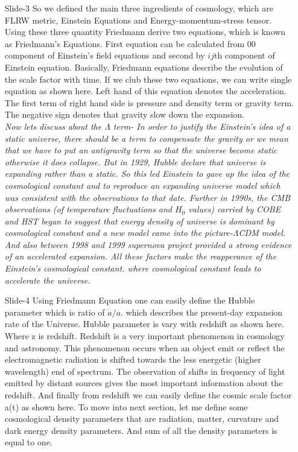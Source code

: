 \documentclass[12pt]{report}
\begin{document}
\begin{itemize}
\item[\ding{74} Slide-3]
So we defined the main three ingredients of cosmology, which are FLRW metric, Einstein Equations and Energy-momentum-stress tensor. Using these three quantity Friedmann derive two equations, which is known as Friedmann's Equations. First equation can be calculated from 00 component of Einstein’s field equations and second by  $ij$th component of Einstein equation. Basically, Friedmann equations describe the evolution of the scale factor with time.  If we club these two equations, we can write single equation as shown here. Left hand of this equation denotes the acceleration. The first term of right hand side is pressure and density term or gravity term. The negative sign denotes that gravity slow down the expansion.\\
\textit{Now lets discuss about the $\Lambda$ term- In order to justify the Einstein's idea of a static universe, there should be a term to compensate the gravity or we mean that we have to put an antigravity term so that the universe become static otherwise it does collapse. But in 1929, Hubble declare that universe is expanding rather than a static. So this led Einstein to gave up the idea of the cosmological constant and to reproduce an expanding universe model which was consistent with the observations to that date. Further in 1990s, the CMB observations (of temperature fluctuations and $H_0$ values) carried by COBE and HST began to suggest that energy density of universe is dominant by cosmological constant and a new model came into the picture-$\Lambda$CDM model. And also between 1998 and 1999 supernova project provided a strong evidence of an accelerated expansion. All these factors make the reapperance of the Einstein's cosmological constant.
where cosmological constant leads to accelerate the universe.} 

\item[\ding{74} Slide-4]
Using Friedmann Equation one can easily define the Hubble parameter which is ratio of $\dot{a}/a$. which describes the present-day expansion rate of the Universe. Hubble parameter is vary with redshift as shown here. Where z is redshift. Redshift is a very important phenomenon in cosmology and astronomy. This phenomenon occurs when an object emit or reflect the electromagnetic radiation is shifted towards the less energetic (higher wavelength) end of spectrum. 
The observation of shifts in frequency of light emitted by distant sources gives the most important information about the redshift. And finally from redshift we can easily define the cosmic scale factor a(t) as shown here. To move into next section, let me define some cosmological density parameters that are radiation, matter, curvature and dark energy density parameters. And sum of all the density parameters is equal to one.


\end{itemize}
\end{document}
